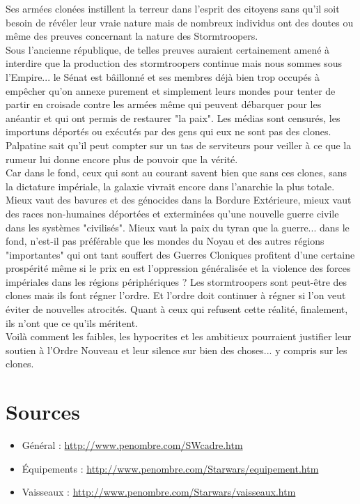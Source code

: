 \documentclass[twoside]{article}
\begin{document}
Ses armées clonées instillent la terreur dans l'esprit des citoyens sans qu'il soit besoin de révéler leur vraie nature mais de nombreux individus ont des doutes ou même des preuves concernant la nature des Stormtroopers.\\

Sous l'ancienne république, de telles preuves auraient certainement amené à interdire que la production des stormtroopers continue mais nous sommes sous l'Empire... le Sénat est bâillonné et ses membres déjà bien trop occupés à empêcher qu'on annexe purement et simplement leurs mondes pour tenter de partir en croisade contre les armées même qui peuvent débarquer pour les anéantir et qui ont permis de restaurer "la paix". Les médias sont censurés, les importuns déportés ou exécutés par des gens qui eux ne sont pas des clones. Palpatine sait qu'il peut compter sur un tas de serviteurs  pour veiller à ce que la rumeur lui donne encore plus de pouvoir que la vérité.\\

Car dans le fond, ceux qui sont au courant savent bien que sans ces clones, sans la dictature impériale, la galaxie vivrait encore dans l'anarchie la plus totale. Mieux vaut des bavures et des génocides dans la Bordure Extérieure, mieux vaut des races non-humaines déportées et exterminées qu'une nouvelle guerre civile dans les systèmes "civilisés". Mieux vaut la paix du tyran que la guerre... dans le fond, n'est-il pas préférable que les mondes du Noyau et des autres régions "importantes" qui ont tant souffert des Guerres Cloniques profitent d'une certaine prospérité même si le prix en est l'oppression généralisée et la violence des forces impériales dans les régions périphériques ?  Les stormtroopers sont peut-être des clones mais ils font régner l'ordre. Et l'ordre doit continuer à régner si l'on veut éviter de nouvelles atrocités. Quant à ceux qui refusent cette réalité, finalement, ils n'ont que ce qu'ils méritent.\\

Voilà comment les faibles, les hypocrites et les ambitieux pourraient justifier leur soutien à l'Ordre Nouveau et leur silence sur bien des choses... y compris sur les clones.


\section{Sources}
\begin{itemize}
	\item Général : \url{http://www.penombre.com/SWcadre.htm}
	\item Équipements : \url{http://www.penombre.com/Starwars/equipement.htm}
	\item Vaisseaux : \url{http://www.penombre.com/Starwars/vaisseaux.htm}
\end{itemize}
\end{document}
